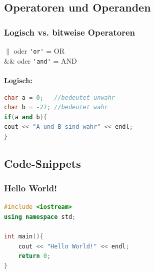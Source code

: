     \subsection{Operatoren und Operanden}

        \subsubsection{Logisch vs. bitweise Operatoren}
            $\parallel$ oder \verb|'or'| = OR\\
            \&\& oder \verb|'and'| = AND \\
            \\
            \textbf{Logisch:}
                \begin{lstlisting}[language=C++]
char a = 0;   //bedeutet unwahr
char b = -27; //bedeutet wahr
if(a and b){
cout << "A und B sind wahr" << endl;
}	
                \end{lstlisting}

    \subsection{Code-Snippets}

        \subsubsection{Hello World!}
            \begin{lstlisting}[language=C++]
#include <iostream>
using namespace std;

int main(){
    cout << "Hello World!" << endl;
    return 0;
}
            \end{lstlisting}
